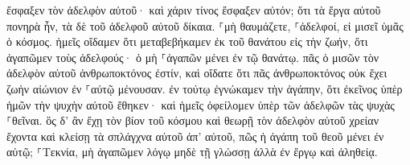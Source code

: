 \documentclass{openreader}
\begin{document}
ἔσφαξεν τὸν ἀδελφὸν αὐτοῦ· καὶ χάριν τίνος ἔσφαξεν αὐτόν; ὅτι τὰ ἔργα αὐτοῦ πονηρὰ ἦν, τὰ δὲ τοῦ ἀδελφοῦ αὐτοῦ δίκαια. ⸀μὴ θαυμάζετε, ⸀ἀδελφοί, εἰ μισεῖ ὑμᾶς ὁ κόσμος. ἡμεῖς οἴδαμεν ὅτι μεταβεβήκαμεν ἐκ τοῦ θανάτου εἰς τὴν ζωήν, ὅτι ἀγαπῶμεν τοὺς ἀδελφούς· ὁ μὴ ⸀ἀγαπῶν μένει ἐν τῷ θανάτῳ. πᾶς ὁ μισῶν τὸν ἀδελφὸν αὐτοῦ ἀνθρωποκτόνος ἐστίν, καὶ οἴδατε ὅτι πᾶς ἀνθρωποκτόνος οὐκ ἔχει ζωὴν αἰώνιον ἐν ⸀αὐτῷ μένουσαν. ἐν τούτῳ ἐγνώκαμεν τὴν ἀγάπην, ὅτι ἐκεῖνος ὑπὲρ ἡμῶν τὴν ψυχὴν αὐτοῦ ἔθηκεν· καὶ ἡμεῖς ὀφείλομεν ὑπὲρ τῶν ἀδελφῶν τὰς ψυχὰς ⸀θεῖναι. ὃς δ’ ἂν ἔχῃ τὸν βίον τοῦ κόσμου καὶ θεωρῇ τὸν ἀδελφὸν αὐτοῦ χρείαν ἔχοντα καὶ κλείσῃ τὰ σπλάγχνα αὐτοῦ ἀπ’ αὐτοῦ, πῶς ἡ ἀγάπη τοῦ θεοῦ μένει ἐν αὐτῷ; ⸀Τεκνία, μὴ ἀγαπῶμεν λόγῳ μηδὲ τῇ γλώσσῃ ἀλλὰ ἐν ἔργῳ καὶ ἀληθείᾳ. 
\end{document}
